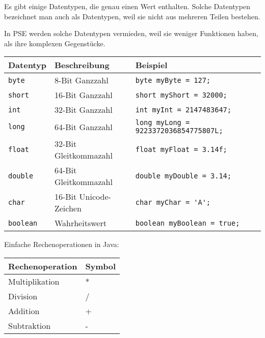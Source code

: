 \begin{Infobox}

Es gibt einige  Datentypen, die genau einen Wert enthalten.
Solche Datentypen bezeichnet man auch als  Datentypen, weil sie nicht aus mehreren Teilen bestehen.

In PSE werden solche Datentypen vermieden, weil sie weniger Funktionen haben, als ihre komplexen Gegenstücke.

\begin{center}
  \begin{tabular}{|l|l|l|}
    \hline
    \textbf{Datentyp} & \textbf{Beschreibung} & \textbf{Beispiel} \\
    \hline
    \texttt{byte} & 8-Bit Ganzzahl & \lstinline|byte myByte = 127;| \\
    \hline
    \texttt{short} & 16-Bit Ganzzahl & \lstinline|short myShort = 32000;| \\
    \hline
    \texttt{int} & 32-Bit Ganzzahl & \lstinline|int myInt = 2147483647;| \\
    \hline
    \texttt{long} & 64-Bit Ganzzahl & \lstinline|long myLong = 9223372036854775807L;| \\
    \hline
    \texttt{float} & 32-Bit Gleitkommazahl & \lstinline|float myFloat = 3.14f;| \\
    \hline
    \texttt{double} & 64-Bit Gleitkommazahl & \lstinline|double myDouble = 3.14;| \\
    \hline
    \texttt{char} & 16-Bit Unicode-Zeichen & \lstinline|char myChar = 'A';| \\
    \hline
    \texttt{boolean} & Wahrheitswert & \lstinline|boolean myBoolean = true;| \\
    \hline
  \end{tabular}
\end{center}

Einfache Rechenoperationen in Java:
\begin{center}
  \begin{tabular}{|l|l|}
    \hline
    \textbf{Rechenoperation} & \textbf{Symbol} \\
    \hline
    Multiplikation & * \\
    \hline
    Division & / \\
    \hline
    Addition & + \\
    \hline
    Subtraktion & - \\
    \hline
  \end{tabular}
\end{center}


\end{Infobox}
